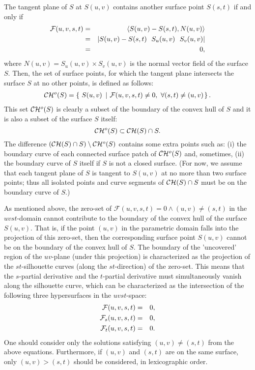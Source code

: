 \documentclass[doublespacing]{elsart}
\begin{document}
The tangent plane of $S$ at $S(u,v)$ contains
another surface point $S(s,t)$ if and only if 
\begin{eqnarray*}
   {\mathcal F}(u,v,s,t) &=& \inner{S(u,v)-S(s,t)}{N(u,v)}\\
   &=& |S(u,v)-S(s,t)\ \ S_u(u,v)\ \ S_v(u,v)|\\
   &=& 0,
\end{eqnarray*}
where $N(u,v) = S_u(u,v) \times S_v(u,v)$ is the normal vector field 
of the surface $S$. Then, the set of surface points, for which 
the tangent plane intersects the surface $S$ at no other points, 
is defined as follows:
\begin{eqnarray*}
\CH{}^o(S) = \left\{~S(u,v)~\left|~ 
{\cal F}(u,v,s,t) \neq 0,~\forall (s,t) \neq (u,v) \right. \right\}.
\end{eqnarray*}
This set $\CH{}^o(S)$ is clearly a subset of the boundary of the convex hull
of $S$ and it is also a subset of the surface $S$ itself:
\begin{equation}
    \CH{}^o(S) \subset \CH{}(S) \cap S.
\label{eqn-cho-ch}
\end{equation}
The difference $(\CH{}(S) \cap S) \setminus \CH{}^o(S)$ contains some extra
points such as: (i) the boundary curve of each connected surface patch of
$\CH{}^o(S)$ and, sometimes, (ii) the boundary curve of $S$ itself if $S$ is 
not a closed surface.  (For now, we assume that each tangent plane of $S$ is
tangent to $S(u,v)$ at no more than two surface points;
thus all isolated points and curve segments of
$\CH{}(S) \cap S$ must be on the boundary curve of $S$.)

As mentioned above, the zero-set of 
${\mathcal F}(u,v,s,t) = 0 \wedge (u,v) \neq (s,t)$ in
the $uvst$-domain cannot contribute to the boundary of the convex hull
of the surface $S(u,v)$. That is, if the point $(u,v)$ in the parametric
domain falls into the projection of this zero-set, then the corresponding
surface point $S(u,v)$ cannot be on the boundary of the convex hull 
of $S$. The boundary of the 'uncovered' region of the $uv$-plane
(under this projection) is characterized as the projection of the 
$st$-silhouette curves (along the $st$-direction) of the zero-set. This means
that the $s$-partial derivative and the $t$-partial derivative must 
simultaneously vanish along the silhouette curve, which can be 
characterized as the
intersection of the following three hypersurfaces in the $uvst$-space:
\begin{eqnarray}
   {\cal F}(u,v,s,t) &=& 0, \label{eqn-f-uvst} \\
   {\cal F}_s(u,v,s,t) &=& 0, \label{eqn-s-partial}\\
   {\cal F}_t(u,v,s,t) &=& 0. \label{eqn-t-partial}
\end{eqnarray}
One should consider only the solutions satisfying $(u,v) \neq (s,t)$
from the above equations. Furthermore, if $(u,v)$ and $(s,t)$ are
on the same surface, only $(u,v) > (s,t)$ should be considered, in
lexicographic order.
\end{document}
